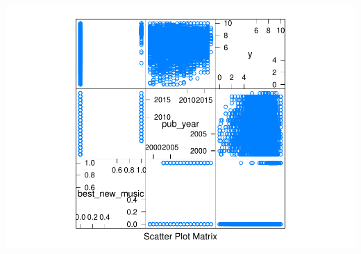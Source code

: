 \documentclass{article}
\begin{document}
\includegraphics{report_files/figure-latex/unnamed-chunk-2-4.pdf}



\end{document}
